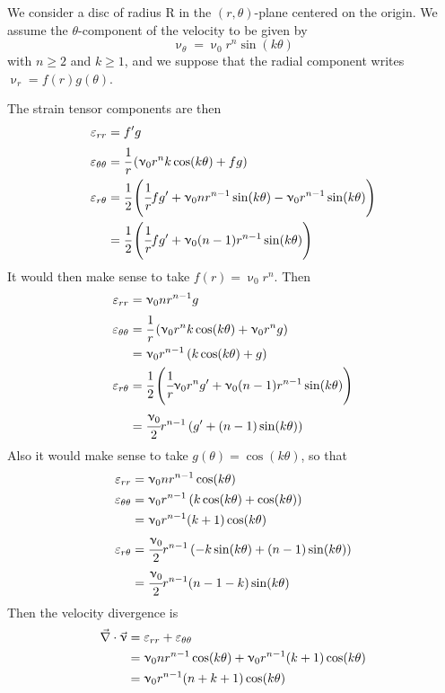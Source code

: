 We consider a disc of radius R in the $(r,\theta)$-plane centered on the origin. 
We assume the $\theta$-component of the velocity to be given by
\[
\upnu_\theta = \upnu_0 r^n \sin (k \theta) 
\] 
with $n\ge 2$ and $k\ge 1$, 
and we suppose that the radial component writes $\upnu_r = f(r)g(\theta)$.

The strain tensor components are then
\begin{align}
\varepsilon_{rr} & = f' g \nonumber\\
\varepsilon_{\theta\theta}  &= 
\cfrac{1}{r}\left( \upnu_0 r^n k \cos (k\theta) +  fg \right) \nonumber\\
\varepsilon_{r\theta} 
& = \cfrac{1}{2}\left(\cfrac{1}{r} fg' + \upnu_0 n r^{n-1} \sin (k \theta) - \upnu_0 r^{n-1} \sin (k\theta)  \right) \nonumber\\
& = \cfrac{1}{2}\left(\cfrac{1}{r} fg' + \upnu_0 (n-1) r^{n-1} \sin (k \theta)   \right) \nonumber
\end{align}
It would then make sense to take $f(r)=\upnu_0 r^n$. Then
\begin{align}
\varepsilon_{rr} & = \upnu_0 n r^{n-1} g \nonumber\\
\varepsilon_{\theta\theta}  
&= \cfrac{1}{r}\left( \upnu_0 r^n k \cos (k\theta) + \upnu_0 r^n  g \right) \nonumber\\
&= \upnu_0 r^{n-1} \left(  k \cos (k\theta) +  g \right)\nonumber \\
\varepsilon_{r\theta} 
& = \cfrac{1}{2}\left(\cfrac{1}{r} \upnu_0 r^n g' + \upnu_0 (n-1) r^{n-1} \sin (k \theta)   \right) \nonumber\\
& = \cfrac{\upnu_0}{2}  r^{n-1} \left( g' +  (n-1) \sin (k \theta)   \right)  \nonumber
\end{align}
Also it would make sense to take $g(\theta)=\cos (k\theta)$, so that 
\begin{align}
\varepsilon_{rr} & = \upnu_0 n r^{n-1} \cos (k\theta) \nonumber\\
\varepsilon_{\theta\theta}  
&= \upnu_0 r^{n-1} \left(  k \cos (k\theta) +  \cos (k\theta) \right) \nonumber\\
&= \upnu_0 r^{n-1} (k+1) \cos (k\theta) \nonumber \\
\varepsilon_{r\theta} 
& = \cfrac{\upnu_0}{2}  r^{n-1} \left( -k \sin(k\theta) +  (n-1) \sin (k \theta)   \right)  \nonumber\\
& = \cfrac{\upnu_0}{2}  r^{n-1}  (n-1-k)  \sin (k \theta)   \nonumber
\end{align}
Then the velocity divergence is
\begin{align}
\vec\nabla\cdot\vec\upnu 
&= \varepsilon_{rr} + \varepsilon_{\theta\theta} \nonumber\\
&= \upnu_0 n r^{n-1} \cos (k\theta)
+\upnu_0 r^{n-1} (k+1) \cos (k\theta ) \nonumber\\
&= \upnu_0  r^{n-1} (n+k+1) \cos (k\theta )
\end{align}
